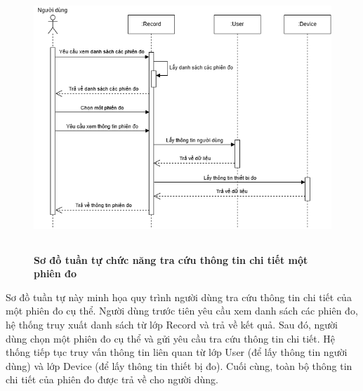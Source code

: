 \begin{figure}[H]
	\centering
	\includegraphics[width=12cm,height=10cm]{Images/sequence/record/getById.drawio.png}
	\caption[Sơ đồ tuần tự chức năng tra cứu thông tin chi tiết một phiên đo]{\bfseries \fontsize{12pt}{0pt}
		\selectfont Sơ đồ tuần tự chức năng tra cứu thông tin chi tiết một phiên đo}
	\label{sequence_get_record_by_id} %
\end{figure}
Sơ đồ tuần tự này minh họa quy trình người dùng tra cứu thông tin chi tiết của một phiên đo cụ thể. Người dùng trước tiên yêu cầu xem danh sách các phiên đo, hệ thống truy xuất danh sách từ lớp Record và trả về kết quả.
Sau đó, người dùng chọn một phiên đo cụ thể và gửi yêu cầu tra cứu thông tin chi tiết. Hệ thống tiếp tục truy vấn thông tin liên quan từ lớp User (để lấy thông tin người dùng) và lớp Device (để lấy thông tin thiết bị đo).
Cuối cùng, toàn bộ thông tin chi tiết của phiên đo được trả về cho người dùng.

